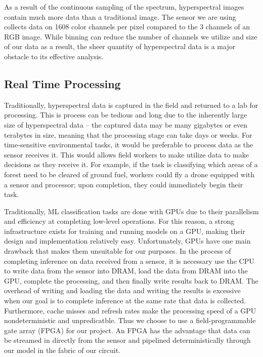 \documentclass{article}
\newcommand{\mycomment}[1]{}
\begin{document}
As a result of the continuous sampling of the spectrum, hyperspectral images contain much more data than a traditional image. The sensor we are using collects data on 1608 color channels per pixel compared to the 3 channels of an RGB image. While binning can reduce the number of channels we utilize and size of our data as a result, the sheer quantity of hyperspectral data is a major obstacle to its effective analysis.

\subsection{Real Time Processing}
Traditionally, hyperspectral data is captured in the field and returned to a lab for processing. This is process can be tedious and long due to the inherently large size of hyperspectral data -- the captured data may be many gigabytes or even terabytes in size, meaning that the processing stage can take days or weeks.\mycomment{Note: is this true??} For time-sensitive environmental tasks, it would be preferable to process data as the sensor receives it. This would allows field workers to make utilize data to make decisions as they receive it. For example, if the task is classifying which areas of a forest need to be cleared of ground fuel, workers could fly a drone equipped with a sensor and processor; upon completion, they could immediately begin their task.

Traditionally, ML classification tasks are done with GPUs due to their parallelism and efficiency at completing low-level operations. For this reason, a strong infrastructure exists for training and running models on a GPU, making their design and implementation relatively easy. Unfortunately, GPUs have one main drawback that makes them unsuitable for our purposes. In the process of completing inference on data received from a sensor, it is necessary use the CPU to write data from the sensor into DRAM, load the data from DRAM into the GPU, complete the processing, and then finally write results back to DRAM. The overhead of writing and loading the data and writing the results is excessive when our goal is to complete inference at the same rate that data is collected. Furthermore, cache misses and refresh rates make the processing speed of a GPU nondeterministic and unpredicatble. Thus we choose to use a field-programmable gate array (FPGA) for our project. An FPGA has the advantage that data can be streamed in directly from the sensor and pipelined deterministically through our model in the fabric of our circuit.
\end{document}
